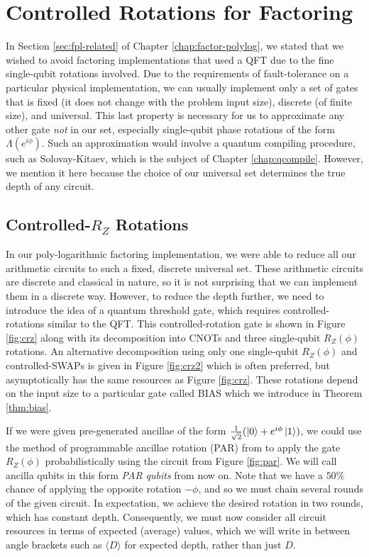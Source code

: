 \section{Controlled Rotations for Factoring}
\label{sec:fsl-qcompile}

In Section \ref{sec:fpl-related} of Chapter \ref{chap:factor-polylog},
we stated that we wished to avoid
factoring implementations that used a QFT due to the fine
single-qubit rotations involved. Due to the requirements of
fault-tolerance on a particular physical implementation,
we can usually implement only a set of gates that is fixed
(it does not change with the problem input size), discrete (of finite size),
and universal. This last property is necessary for us to approximate any
other gate \emph{not} in our set, especially single-qubit phase rotations
of the form $\Lambda(e^{i \phi})$. Such an approximation would involve
a quantum compiling procedure, such as Solovay-Kitaev, which is the
subject of Chapter \ref{chap:qcompile}. However, we mention it here
because the choice of our universal set determines the true depth
of any circuit.

\subsection{Controlled-$R_Z$ Rotations}

In our poly-logarithmic factoring implementation, we were able to reduce
all our arithmetic circuits to such a fixed, discrete universal set.
These arithmetic circuits are discrete and classical in nature, so it is
not surprising that we can implement them in a discrete way.
However, to reduce the depth further, we need to introduce the idea of
a quantum threshold gate, which requires controlled-rotations similar to
the QFT. This controlled-rotation gate is shown in Figure \ref{fig:crz}
along with its decomposition into CNOTs and three single-qubit $R_Z(\phi)$
rotations. An alternative decomposition using only one single-qubit
$R_Z(\phi)$ and controlled-SWAPs is given in Figure \ref{fig:crz2} which
is often preferred, but asymptotically has the same resources as
Figure \ref{fig:crz}.
These rotations depend on the input size to a particular gate called
BIAS which we introduce in Theorem \ref{thm:bias}.

If we were given pre-generated ancillae of the form
$\frac{1}{\sqrt{2}} (\left\vert{0}\right\rangle + e^{i\phi}\left\vert{1}\right\rangle)$,
we could use the method of programmable ancillae rotation (PAR) from
\cite{Jones2012}
to apply the gate $R_Z(\phi)$ probabilistically
using the circuit from Figure \ref{fig:par}.
We will call ancilla qubits in this form \emph{PAR qubits} from now on.
Note that we have a $50\%$
chance
of applying the opposite rotation $-\phi$, and so we must chain
several rounds of the given circuit. In expectation, we achieve the
desired rotation in two rounds, which has constant depth.
Consequently, we must now consider
all circuit resources in terms of expected (average) values, which we will
write in between angle brackets such as $\langle D \rangle$ for expected
depth, rather than just $D$.

